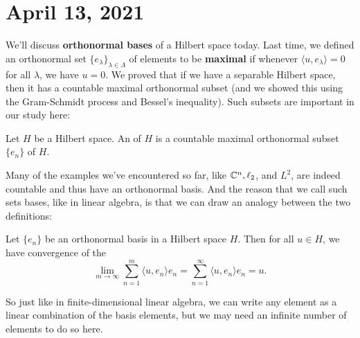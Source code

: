 \pagebreak\section{April 13, 2021}

We'll discuss \textbf{orthonormal bases} of a Hilbert space today. Last time, we defined an orthonormal set $\{e_{\lambda}\}_{\lambda \in \Lambda}$ of elements to be \textbf{maximal} if whenever $\langle u, e_\lambda \rangle = 0$ for all $\lambda$, we have $u = 0$. We proved that if we have a separable Hilbert space, then it has a countable maximal orthonormal subset (and we showed this using the Gram-Schmidt process and Bessel's inequality). Such subsets are important in our study here:

\begin{definition}
Let $H$ be a Hilbert space. An  of $H$ is a countable maximal orthonormal subset $\{e_n\}$ of $H$.
\end{definition}

Many of the examples we've encountered so far, like $\mathbb C^n, \ell_2$, and $L^2$, are indeed countable and thus have an orthonormal basis. And the reason that we call such sets bases, like in linear algebra, is that we can draw an analogy between the two definitions:

\begin{theorem}\label{orthonormconv}
Let $\{e_n\}$ be an orthonormal basis in a Hilbert space $H$. Then for all $u \in H$, we have convergence of the 
\[
    \lim_{m \to \infty} \sum_{n=1}^m \langle u, e_n \rangle e_n = \sum_{n=1}^\infty \langle u, e_n \rangle e_n = u.
\]
\end{theorem}

So just like in finite-dimensional linear algebra, we can write any element as a linear combination of the basis elements, but we may need an infinite number of elements to do so here.

